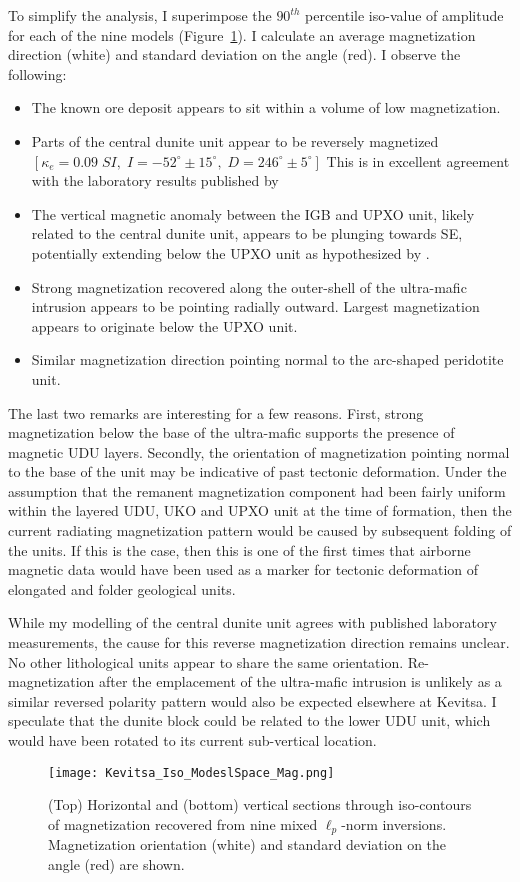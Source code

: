 To simplify the analysis, I superimpose the $90^{th}$ percentile iso-value of amplitude for each of the nine models (Figure~\ref{MVIS_Iso_model}). I calculate an average magnetization direction (white) and standard deviation on the angle (red). I observe the following:
\begin{itemize}
\item The known ore deposit appears to sit within a volume of low magnetization.
\item Parts of the central dunite unit appear to be reversely magnetized $[\kappa_{e} = 0.09\;SI, \;I=-52^\circ \pm 15^\circ, \;D=246^\circ \pm 5^\circ]$ This is in excellent agreement with the laboratory results published by \cite{Montonen2012}
\item The vertical magnetic anomaly between the IGB and UPXO unit, likely related to the central dunite unit, appears to be plunging towards SE, potentially extending below the UPXO unit as hypothesized by \cite{Koivisto2015}.
\item Strong magnetization recovered along the outer-shell of the ultra-mafic intrusion appears to be pointing radially outward. Largest magnetization appears to originate below the UPXO unit.
\item Similar magnetization direction pointing normal to the arc-shaped peridotite unit.
\end{itemize}

The last two remarks are interesting for a few reasons. First, strong magnetization below the base of the ultra-mafic supports the presence of magnetic UDU layers.
Secondly, the orientation of magnetization pointing normal to the base of the unit may be indicative of past tectonic deformation.
Under the assumption that the remanent magnetization component had been fairly uniform within the layered UDU, UKO and UPXO unit at the time of formation, then the current radiating magnetization pattern would be caused by subsequent folding of the units.
If this is the case, then this is one of the first times that airborne magnetic data would have been used as a marker for tectonic deformation of elongated and folder geological units.

While my modelling of the central dunite unit agrees with published laboratory measurements, the cause for this reverse magnetization direction remains unclear. No other lithological units appear to share the same orientation. Re-magnetization after the emplacement of the ultra-mafic intrusion is unlikely as a similar reversed polarity pattern would also be expected elsewhere at Kevitsa. I speculate that the dunite block could be related to the lower UDU unit, which would have been rotated to its current sub-vertical location.
\begin{figure}[h!]
\texttt{[image: Kevitsa\_Iso\_ModeslSpace\_Mag.png]}
\caption{(Top) Horizontal and (bottom) vertical sections through iso-contours of magnetization recovered from nine mixed $\ell_p$-norm inversions. Magnetization orientation (white) and standard deviation on the angle (red) are shown.}
\label{MVIS_Iso_model}
\end{figure}


